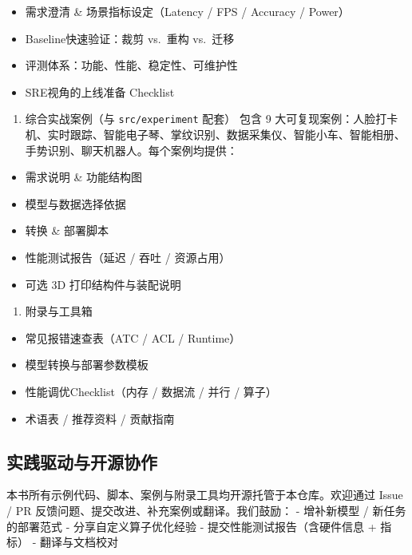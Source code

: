 \begin{itemize}
\tightlist
\item
  需求澄清 \& 场景指标设定（Latency / FPS / Accuracy / Power）
\item
  Baseline快速验证：裁剪 vs.~重构 vs.~迁移
\item
  评测体系：功能、性能、稳定性、可维护性
\item
  SRE视角的上线准备 Checklist
\end{itemize}

\begin{enumerate}
\def\labelenumi{\arabic{enumi}.}
\setcounter{enumi}{7}
\tightlist
\item
  综合实战案例（与 \texttt{src/experiment} 配套） 包含 9
  大可复现案例：人脸打卡机、实时跟踪、智能电子琴、掌纹识别、数据采集仪、智能小车、智能相册、手势识别、聊天机器人。每个案例均提供：
\end{enumerate}

\begin{itemize}
\tightlist
\item
  需求说明 \& 功能结构图
\item
  模型与数据选择依据
\item
  转换 \& 部署脚本
\item
  性能测试报告（延迟 / 吞吐 / 资源占用）
\item
  可选 3D 打印结构件与装配说明
\end{itemize}

\begin{enumerate}
\def\labelenumi{\arabic{enumi}.}
\setcounter{enumi}{8}
\tightlist
\item
  附录与工具箱
\end{enumerate}

\begin{itemize}
\tightlist
\item
  常见报错速查表（ATC / ACL / Runtime）
\item
  模型转换与部署参数模板
\item
  性能调优Checklist（内存 / 数据流 / 并行 / 算子）
\item
  术语表 / 推荐资料 / 贡献指南
\end{itemize}

\subsection*{实践驱动与开源协作}\label{实践驱动与开源协作}

本书所有示例代码、脚本、案例与附录工具均开源托管于本仓库。欢迎通过 Issue
/ PR 反馈问题、提交改进、补充案例或翻译。我们鼓励： - 增补新模型 /
新任务的部署范式 - 分享自定义算子优化经验 - 提交性能测试报告（含硬件信息
+ 指标） - 翻译与文档校对

